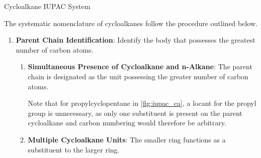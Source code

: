 \documentclass[10pt]{article}
\begin{document}
      \begin{core}[label=core:cycloalkane_iupac]{Cycloalkane IUPAC System}

        The systematic nomenclature of cycloalkanes follow the procedure outlined below.

        \begin{enumerate}[label=(\arabic*)]

          \item \textbf{Parent Chain Identification}: Identify the body that possesses the greatest number of carbon atoms.

          \begin{enumerate}
            
            \item \textbf{Simultaneous Presence of Cycloalkane and n-Alkane}: The parent chain is designated as the unit possessing the greater number of carbon atoms.


            Note that for propylcyclopentane in \autoref{fig:iupac_ca}, a locant for the propyl group is unnecessary, as only one substituent is present on the parent cycloalkane and carbon numbering would therefore be arbitrary.

            \item \textbf{Multiple Cycloalkane Units}: The smaller ring functions as a substituent to the larger ring.


          \end{enumerate}


\end{enumerate}
\end{core}
\end{document}
